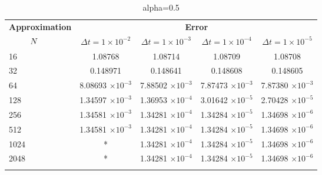 	\begin{table}
		\begin{tabular}{lcccc}
		\toprule
		\multicolumn{1}{c}{\textbf{Approximation}} & \multicolumn{4}{c}{\textbf{Error}} \\
		$\hspace{9mm}N$ & $\Delta t=1\times 10^{-2}$ & $\Delta t=1\times 10^{-3}$ & $\Delta t=1\times 10^{-4}$ & $\Delta t=1\times 10^{-5}$ \\
		\midrule
		\hspace{7mm} 16 & 1.08768    & 1.08714     & 1.08709     & 1.08708     \\
		\midrule
		\hspace{7mm} 32 & 0.148971   & 0.148641    & 0.148608    & 0.148605    \\
		\midrule
		\hspace{7mm} 64 & 8.08693 $\times 10^{-3}$ & 7.88502 $\times 10^{-3}$  & 7.87473 $\times 10^{-3}$  & 7.87380 $\times 10^{-3}$   \\
		\midrule
		\hspace{7mm} 128 & 1.34597 $\times 10^{-3}$ & 1.36953 $\times 10^{-4}$ & 3.01642 $\times 10^{-5}$ & 2.70428 $\times 10^{-5}$ \\
		\midrule
		\hspace{7mm} 256 & 1.34581 $\times 10^{-3}$ & 1.34281 $\times 10^{-4}$ & 1.34284 $\times 10^{-5}$ & 1.34698 $\times 10^{-6}$ \\
		\midrule
		\hspace{7mm} 512 & 1.34581 $\times 10^{-3}$ & 1.34281 $\times 10^{-4}$ & 1.34284 $\times 10^{-5}$ & 1.34698 $\times 10^{-6}$ \\
		\midrule
		\hspace{7mm} 1024 & *          & 1.34281 $\times 10^{-4}$ & 1.34284 $\times 10^{-5}$ & 1.34698 $\times 10^{-6}$ \\
		\midrule
		\hspace{7mm} 2048 & *          & 1.34281 $\times 10^{-4}$ & 1.34284 $\times 10^{-5}$ & 1.34698 $\times 10^{-6}$ \\
		\\
		\bottomrule
		\end{tabular}
		\caption{alpha=0.5}
	\end{table}	

